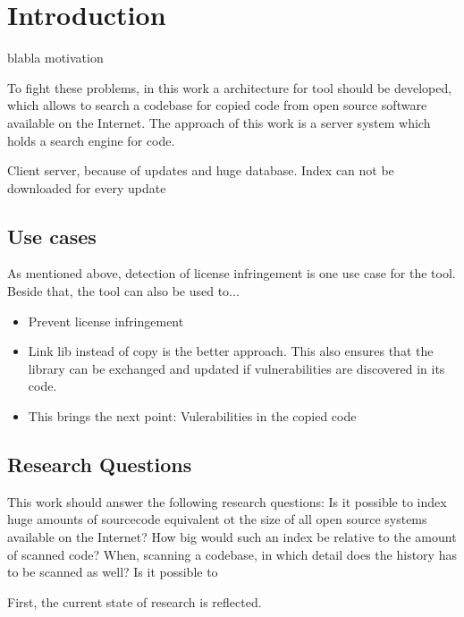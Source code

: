 
\chapter{Introduction}\label{chapter:introduction}
blabla motivation

To fight these problems, in this work a architecture for tool should be developed, which allows to search a codebase for copied code from open source software available on the Internet.
The approach of this work is a server system which holds a search engine for code.

Client server, because of updates and huge database. Index can not be downloaded for every update


\section{Use cases}\label{section:introduction/use_cases}
As mentioned above, detection of license infringement is one use case for the tool.
Beside that, the tool can also be used to...
\begin{itemize}
	\item Prevent license infringement
	\item Link lib instead of copy is the better approach. This also ensures that the library can be exchanged and updated if vulnerabilities are discovered in its code.
	\item This brings the next point: Vulerabilities in the copied code
\end{itemize}

\section{Research Questions}\label{section:introduction/research_questions}
This work should answer the following research questions:
Is it possible to index huge amounts of sourcecode equivalent ot the size of all open source systems available on the Internet?
How big would such an index be relative to the amount of scanned code?
When, scanning a codebase, in which detail does the history has to be scanned as well? %
Is it possible to 


First, the current state of research is reflected.